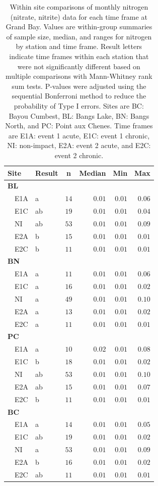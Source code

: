 \documentclass[letterpaper,12pt]{article}\usepackage[]{graphicx}\usepackage[]{color}
\begin{document}
\clearpage

\begin{table}[!tbp]
\caption{Within site comparisons  of monthly nitrogen (nitrate, nitrite) data for each time frame at Grand Bay.  Values are within-group summaries of sample size, median, and ranges for nitrogen by station and time frame.  Result letters indicate time frames within each station that were not significantly different based on multiple comparisons with Mann-Whitney rank sum tests.  P-values were adjusted using the sequential Bonferroni method to reduce the probability of Type I errors. Sites are BC: Bayou Cumbest, BL: Bangs Lake, BN: Bangs North, and PC: Point aux Chenes.  Time frames are E1A: event 1 acute, E1C: event 1 chronic, NI: non-impact, E2A: event 2 acute, and E2C: event 2 chronic.\label{tab:tntab}} 
\begin{center}
\begin{tabular}{llrrrr}
\hline\hline
\multicolumn{1}{l}{Site}&\multicolumn{1}{c}{Result}&\multicolumn{1}{c}{n}&\multicolumn{1}{c}{Median}&\multicolumn{1}{c}{Min}&\multicolumn{1}{c}{Max}\tabularnewline
\hline
{\bfseries BL}&&&&&\tabularnewline
~~E1A&a&$14$&$0.01$&$0.01$&$0.06$\tabularnewline
~~E1C&ab&$19$&$0.01$&$0.01$&$0.04$\tabularnewline
~~NI&ab&$53$&$0.01$&$0.01$&$0.09$\tabularnewline
~~E2A&b&$15$&$0.01$&$0.01$&$0.01$\tabularnewline
~~E2C&b&$11$&$0.01$&$0.01$&$0.01$\tabularnewline
\hline
{\bfseries BN}&&&&&\tabularnewline
~~E1A&a&$11$&$0.01$&$0.01$&$0.06$\tabularnewline
~~E1C&a&$16$&$0.01$&$0.01$&$0.02$\tabularnewline
~~NI&a&$49$&$0.01$&$0.01$&$0.10$\tabularnewline
~~E2A&a&$13$&$0.01$&$0.01$&$0.02$\tabularnewline
~~E2C&a&$11$&$0.01$&$0.01$&$0.01$\tabularnewline
\hline
{\bfseries PC}&&&&&\tabularnewline
~~E1A&a&$10$&$0.02$&$0.01$&$0.08$\tabularnewline
~~E1C&b&$18$&$0.01$&$0.01$&$0.02$\tabularnewline
~~NI&ab&$53$&$0.01$&$0.01$&$0.10$\tabularnewline
~~E2A&ab&$15$&$0.01$&$0.01$&$0.07$\tabularnewline
~~E2C&b&$11$&$0.01$&$0.01$&$0.01$\tabularnewline
\hline
{\bfseries BC}&&&&&\tabularnewline
~~E1A&a&$14$&$0.01$&$0.01$&$0.05$\tabularnewline
~~E1C&ab&$19$&$0.01$&$0.01$&$0.02$\tabularnewline
~~NI&a&$53$&$0.01$&$0.01$&$0.09$\tabularnewline
~~E2A&b&$16$&$0.01$&$0.01$&$0.02$\tabularnewline
~~E2C&ab&$11$&$0.01$&$0.01$&$0.01$\tabularnewline
\hline
\end{tabular}\end{center}

\end{table}
\end{document}
